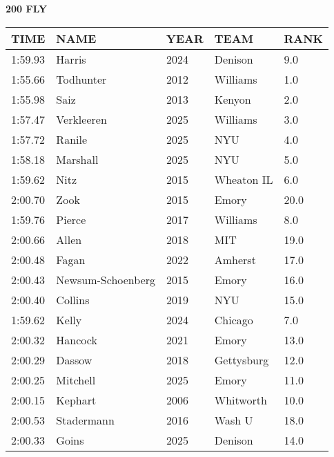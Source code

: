 \begin{minipage}[t]{0.48\textwidth}
\centering
\textbf{200 FLY}\\[0.05cm]
\begin{tabular}{@{}p{1.8cm}p{2.8cm}p{1.2cm}p{1.4cm}p{0.8cm}@{}}
\hline
\textbf{TIME} & \textbf{NAME} & \textbf{YEAR} & \textbf{TEAM} & \textbf{RANK} \\
\hline
1:59.93 & Harris & 2024 & Denison & 9.0 \\
1:55.66 & Todhunter & 2012 & Williams & 1.0 \\
1:55.98 & Saiz & 2013 & Kenyon & 2.0 \\
1:57.47 & Verkleeren & 2025 & Williams & 3.0 \\
1:57.72 & Ranile & 2025 & NYU & 4.0 \\
1:58.18 & Marshall & 2025 & NYU & 5.0 \\
1:59.62 & Nitz & 2015 & Wheaton IL & 6.0 \\
2:00.70 & Zook & 2015 & Emory & 20.0 \\
1:59.76 & Pierce & 2017 & Williams & 8.0 \\
2:00.66 & Allen & 2018 & MIT & 19.0 \\
2:00.48 & Fagan & 2022 & Amherst & 17.0 \\
2:00.43 & Newsum-Schoenberg & 2015 & Emory & 16.0 \\
2:00.40 & Collins & 2019 & NYU & 15.0 \\
1:59.62 & Kelly & 2024 & Chicago & 7.0 \\
2:00.32 & Hancock & 2021 & Emory & 13.0 \\
2:00.29 & Dassow & 2018 & Gettysburg & 12.0 \\
2:00.25 & Mitchell & 2025 & Emory & 11.0 \\
2:00.15 & Kephart & 2006 & Whitworth & 10.0 \\
2:00.53 & Stadermann & 2016 & Wash U & 18.0 \\
2:00.33 & Goins & 2025 & Denison & 14.0 \\
\hline
\end{tabular}
\end{minipage}\hfill
